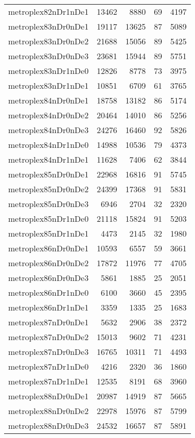 \begin{longtable}{lrrrr}
metroplex82nDr1nDe1 & 13462 & 8880 & 69 & 4197 \\
metroplex83nDr0nDe1 & 19117 & 13625 & 87 & 5089 \\
metroplex83nDr0nDe2 & 21688 & 15056 & 89 & 5425 \\
metroplex83nDr0nDe3 & 23681 & 15944 & 89 & 5751 \\
metroplex83nDr1nDe0 & 12826 & 8778 & 73 & 3975 \\
metroplex83nDr1nDe1 & 10851 & 6709 & 61 & 3765 \\
metroplex84nDr0nDe1 & 18758 & 13182 & 86 & 5174 \\
metroplex84nDr0nDe2 & 20464 & 14010 & 86 & 5256 \\
metroplex84nDr0nDe3 & 24276 & 16460 & 92 & 5826 \\
metroplex84nDr1nDe0 & 14988 & 10536 & 79 & 4373 \\
metroplex84nDr1nDe1 & 11628 & 7406 & 62 & 3844 \\
metroplex85nDr0nDe1 & 22968 & 16816 & 91 & 5745 \\
metroplex85nDr0nDe2 & 24399 & 17368 & 91 & 5831 \\
metroplex85nDr0nDe3 & 6946 & 2704 & 32 & 2320 \\
metroplex85nDr1nDe0 & 21118 & 15824 & 91 & 5203 \\
metroplex85nDr1nDe1 & 4473 & 2145 & 32 & 1980 \\
metroplex86nDr0nDe1 & 10593 & 6557 & 59 & 3661 \\
metroplex86nDr0nDe2 & 17872 & 11976 & 77 & 4705 \\
metroplex86nDr0nDe3 & 5861 & 1885 & 25 & 2051 \\
metroplex86nDr1nDe0 & 6100 & 3660 & 45 & 2395 \\
metroplex86nDr1nDe1 & 3359 & 1335 & 25 & 1683 \\
metroplex87nDr0nDe1 & 5632 & 2906 & 38 & 2372 \\
metroplex87nDr0nDe2 & 15013 & 9602 & 71 & 4231 \\
metroplex87nDr0nDe3 & 16765 & 10311 & 71 & 4493 \\
metroplex87nDr1nDe0 & 4216 & 2320 & 36 & 1860 \\
metroplex87nDr1nDe1 & 12535 & 8191 & 68 & 3960 \\
metroplex88nDr0nDe1 & 20987 & 14919 & 87 & 5665 \\
metroplex88nDr0nDe2 & 22978 & 15976 & 87 & 5799 \\
metroplex88nDr0nDe3 & 24532 & 16657 & 87 & 5891 \\

\end{longtable}
